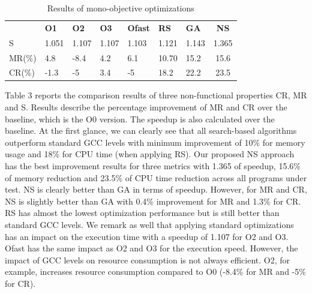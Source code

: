 \begin{table}[h]
	\centering
	\caption{Results of mono-objective optimizations}
	\label{my-label}
	\begin{tabular}{|l|l|l|l|l|l|l|c|}
		\hline
		& \textbf{O1}                    & \textbf{O2}                    & \textbf{O3}                    & \textbf{Ofast}                 & \textbf{RS}                    & \textbf{GA}                    & 
		\textbf{NS} \\
		\hhline{|=|=|=|=|=|=|=|=|}
		S  &  1.051 & 1.107  & 1.107  & 1.103  & 1.121  &  1.143 &  1.365  \\ \hline
		MR(\%) & 4.8  & -8.4  &  4.2 & 6.1  &  10.70 & 15.2  &  15.6  \\ \hline
		CR(\%) & -1.3  & -5  & 3.4  & -5  &  18.2 & 22.2  &  23.5  \\ \hline
	\end{tabular}
\end{table}
Table 3 reports the comparison results of three non-functional properties CR, MR and S. Results describe the percentage improvement of MR and CR over the baseline, which is the O0 version. The speedup is also calculated over the baseline. At the first glance, we can clearly see that all search-based algorithms outperform standard GCC levels with minimum improvement of 10\% for memory usage and 18\% for CPU time (when applying RS). 
Our proposed NS approach has the best improvement results for three metrics with 1.365 of speedup, 15.6\% of memory reduction and 23.5\% of CPU time reduction across all programs under test. NS is clearly better than GA in terms of speedup. However, for MR and CR, NS is slightly better than GA with 0.4\% improvement for MR and 1.3\% for CR. RS has almost the lowest optimization performance but is still better than standard GCC levels.
We remark as well that applying standard optimizations has an impact on the execution time with a speedup of 1.107 for O2 and O3. Ofast has the same impact as O2 and O3 for the execution speed. However, the impact of GCC levels on resource consumption is not always efficient. O2, for example, increases resource consumption compared to O0 (-8.4\% for MR and -5\% for CR).
 	

